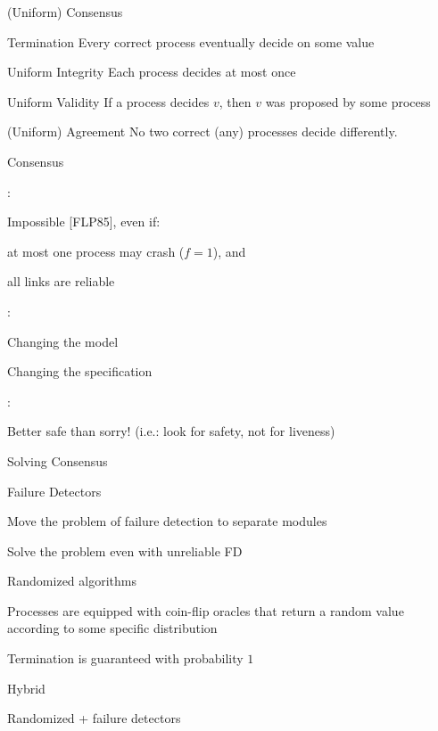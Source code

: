 \begin{frame}{(Uniform) Consensus}

\begin{block}{Termination} Every correct process eventually decide on some value
\end{block}
\begin{block}{Uniform Integrity} Each process decides at most once
\end{block}
\begin{block}{Uniform Validity} If a process decides $v$, then $v$ was proposed by some process
\end{block}
\begin{block}{(Uniform) Agreement} No two correct (any) processes decide differently.
\end{block}
\end{frame}


\begin{frame}{Consensus}
	
:

\BI
\item Impossible [FLP85], even if:
\BI
  \item at most one process may crash ($f = 1$), and
  \item all links are reliable
\EI
\EI

\bigskip
{}:
\BI
  \item \alert<2>{Changing the model}
  \item Changing the specification
\EI

\bigskip
{}:

Better safe than sorry! (i.e.: look for safety, not for liveness)

\end{frame}


\begin{frame}{Solving Consensus}
\BIL
\item \alert{Failure Detectors}
\BI
\item Move the problem of failure detection to separate modules
\item Solve the problem even with unreliable FD
\EI
\item \alert{Randomized algorithms}
\BI
\item Processes are equipped with coin-flip oracles that return a random value according to some specific distribution
\item Termination is guaranteed with probability $1$
\EI
\item \alert{Hybrid}
\BI
\item Randomized + failure detectors
\EI
\EIL
\end{frame}


